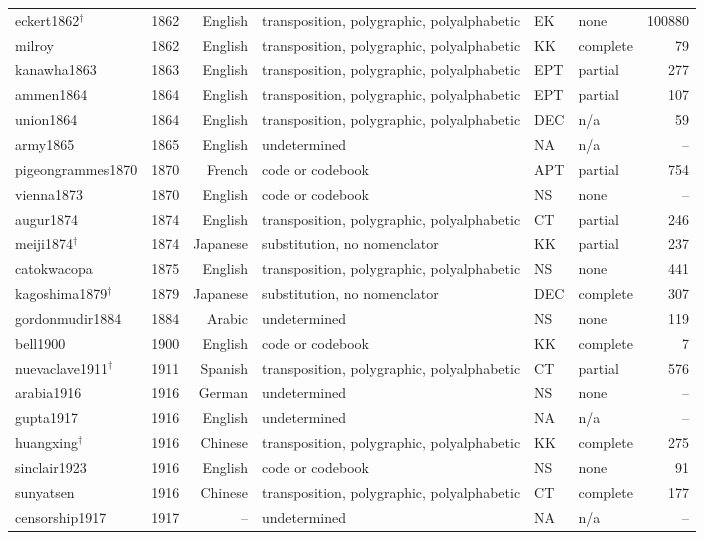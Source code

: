 {\begin{longtable}{@{}llrlllr@{}}
eckert1862$^\dagger$ & 1862 & English & transposition, polygraphic, polyalphabetic & EK & none & 100880 \\
milroy & 1862 & English & transposition, polygraphic, polyalphabetic & KK & complete & 79 \\
kanawha1863 & 1863 & English & transposition, polygraphic, polyalphabetic & EPT & partial & 277 \\
ammen1864 & 1864 & English & transposition, polygraphic, polyalphabetic & EPT & partial & 107 \\
union1864 & 1864 & English & transposition, polygraphic, polyalphabetic & DEC & n/a & 59 \\
army1865 & 1865 & English & undetermined & NA & n/a & -- \\
pigeongrammes1870 & 1870 & French & code or codebook & APT & partial & 754 \\
vienna1873 & 1870 & English & code or codebook & NS & none & -- \\
augur1874 & 1874 & English & transposition, polygraphic, polyalphabetic & CT & partial & 246 \\
meiji1874$^\dagger$ & 1874 & Japanese & substitution, no nomenclator & KK & partial & 237 \\
catokwacopa & 1875 & English & transposition, polygraphic, polyalphabetic & NS & none & 441 \\
kagoshima1879$^\dagger$ & 1879 & Japanese & substitution, no nomenclator & DEC & complete & 307 \\
gordonmudir1884 & 1884 & Arabic & undetermined & NS & none & 119 \\
bell1900 & 1900 & English & code or codebook & KK & complete & 7 \\
nuevaclave1911$^\dagger$ & 1911 & Spanish & transposition, polygraphic, polyalphabetic & CT & partial & 576 \\
arabia1916 & 1916 & German & undetermined & NS & none & -- \\
gupta1917 & 1916 & English & undetermined & NA & n/a & -- \\
huangxing$^\dagger$ & 1916 & Chinese & transposition, polygraphic, polyalphabetic & KK & complete & 275 \\
sinclair1923 & 1916 & English & code or codebook & NS & none & 91 \\
sunyatsen & 1916 & Chinese & transposition, polygraphic, polyalphabetic & CT & complete & 177 \\
censorship1917 & 1917 & -- & undetermined & NA & n/a & -- \\

\end{longtable}}
